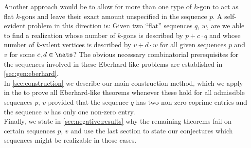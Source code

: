 Another approach would be to allow for more than one type of $k$-gon to act as flat $k$-gons and leave their exact amount unspecified in the sequence $p$. A self-evident problem in this direction is: Given two ``flat'' sequences $q$, $w$, are we able to find a realization whose number of $k$-gons is described by $p + c\cdot q$ and whose number of $k$-valent vertices is described by $v + d\cdot w$ for all given sequences $p$ and $v$ for some $c, d \in \nats$? The obvious necessary combinatorial prerequisites for the sequences involved in these {\sc Eberhard}-like problems are established in \autoref{sec:gen:eberhard}.\\

In \autoref{sec:construction} we describe our main construction method, which we apply in the  to prove all {\sc Eberhard}-like theorems whenever these hold for all admissible sequences $p$, $v$ provided that the sequence $q$ has two non-zero coprime entries and the sequence $w$ has only one non-zero entry.\\

Finally, we state in \autoref{sec:negative:results} why the remaining theorems fail on certain sequences $p$, $v$ and use the last section to state our conjectures which sequences might be realizable in those cases.